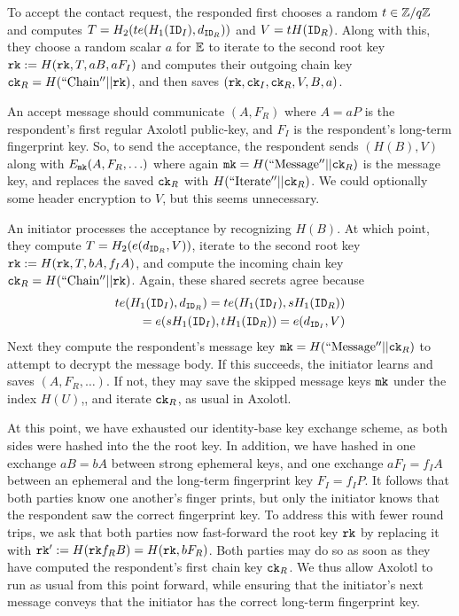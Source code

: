 \documentclass[twoside,letterpaper]{sig-alternate}
\def\mathperiod{.}
\def\mathperiod{}
\begin{document}
To accept the contact request,
the responded first chooses a random $t \in \mathbb{Z}/q\mathbb{Z}$ and
 computes $T = H_2( t e(H_1(\mathtt{ID}_I),d_{\mathtt{ID}_R}) )$ and $V = t H(\mathtt{ID}_R)$.
Along with this, they choose a random scalar $a$ for $\mathbb{E}$ to
iterate to the second root key $\mathtt{rk} := H(\mathtt{rk}, T, a B, a F_I)$ and
 computes their outgoing chain key $\mathtt{ck}_R = H(\mathrm{``Chain''} || \mathtt{rk})$,
and then saves $(\mathtt{rk},\mathtt{ck}_I,\mathtt{ck}_R,V,B,a)$.

An accept message should communicate $(A,F_R)$ where
 $A = a P$ is the respondent's first regular Axolotl public-key, and
 $F_I$ is the respondent's long-term fingerprint key.
So, to send the acceptance, the respondent
sends $(H(B),V)$ along with $E_{\mathtt{mk}}(A,F_R,\ldots)$ where again
 $\mathtt{mk} = H(\mathrm{``Message''}  || \mathtt{ck}_R)$ is the message key,
and replaces the saved $\mathtt{ck}_R$ with $H(\mathrm{``Iterate''} || \mathtt{ck}_R)$.
We could optionally some header encryption to $V$, but this seems unnecessary.

\smallskip

An initiator processes the acceptance by recognizing $H(B)$.
At which point, they compute $T = H_2( e(d_{\mathtt{ID}_R}, V) )$,
iterate to the second root key $\mathtt{rk} := H(\mathtt{rk}, T, b A, f_I A )$, and
compute the incoming chain key $\mathtt{ck}_R = H(\mathrm{``Chain''} || \mathtt{rk})$.
Again, these shared secrets agree because
\begin{align*}
t e(H_1(\ID_I), d_{\ID_R}) = t e(H_1(\ID_I), s H_1(\ID_R)) \\
 \quad = e(s H_1(\ID_I), t H_1(\ID_R)) = e(d_{\ID_I}, V) \mathperiod
\end{align*}
Next they compute the respondent's
 message key $\mathtt{mk} = H(\mathrm{``Message''}  || \mathtt{ck}_R)$
to attempt to decrypt the message body.
If this succeeds, the initiator learns and saves $(A,F_R,\ldots)$.
If not, they may save the skipped message keys $\mathtt{mk}$ under the index $H(U)$,,
and iterate $\mathtt{ck}_R$, as usual in Axolotl.

At this point, we have exhausted our identity-base key exchange scheme,
 as both sides were hashed into the the root key.  In addition, we have
hashed in one exchange $a B = b A$ between strong ephemeral keys, and
one exchange $a F_I = f_I A$ between an ephemeral and
 the long-term fingerprint key $F_I = f_I P$.
It follows that both parties know one another's finger prints, but only
the initiator knows that the respondent saw the correct fingerprint key.
To address this with fewer round trips, we ask that both parties
now fast-forward the root key $\mathtt{rk}$ by replacing it with
 $\mathtt{rk}' := H(\mathtt{rk} f_R B) = H(\mathtt{rk}, b F_R )$.
Both parties may do so as soon as they have computed the respondent's
 first chain key $\mathtt{ck}_R$.
We thus allow Axolotl to run as usual from this point forward, while
ensuring that the initiator's next message conveys that the initiator
 has the correct long-term fingerprint key.
\end{document}
